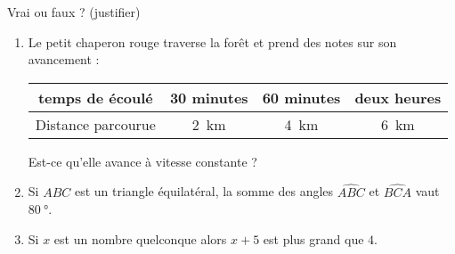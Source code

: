 
\begin{exercice}\label{exo2smath-0251}

    Vrai ou faux ? (justifier)
    \begin{enumerate}
        \item
            Le petit chaperon rouge traverse la forêt et prend des notes sur son avancement :
            \begin{center}
                \begin{tabular}[]{|c||c|c|c|}
                    \hline
                    temps de écoulé&30 minutes&60 minutes&deux heures\\
                    \hline
                    Distance parcourue&\SI{2}{\kilo\meter}&\SI{4}{\kilo\meter}&\SI{6}{\kilo\meter}\\ 
                    \hline
                \end{tabular}
            \end{center}
                Est-ce qu'elle avance à vitesse constante ?
        \item
            Si \( ABC\) est un triangle équilatéral, la somme des angles \( \widehat{ABC}\) et \( \widehat{BCA}\) vaut \(\SI{80}{\degree}\).
        \item
            Si \( x\) est un nombre quelconque alors \( x+5\) est plus grand que \( 4\).
    \end{enumerate}

\end{exercice}
